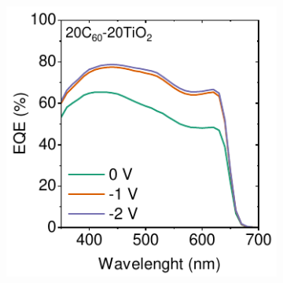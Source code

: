 \begin{figure}[!ht]
\begin{subfigure}{0.32\textwidth}
        \caption{}
        \label{}
    \end{subfigure}
    \hfill
    \begin{subfigure}{0.32\textwidth}
        \centering
        \includegraphics[width=\textwidth]{chapters/transport_layers/images/EQE_20_20.pdf}
        \caption{}
        \label{}
    \end{subfigure}


\end{figure}

